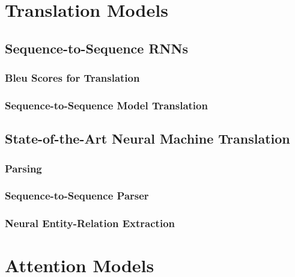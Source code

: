 	\section{Translation Models} %

		\subsection{Sequence-to-Sequence RNNs} %

			\subsubsection{Bleu Scores for Translation} %

			\subsubsection{Sequence-to-Sequence Model Translation} %

		\subsection{State-of-the-Art Neural Machine Translation} %

			\subsubsection{Parsing} %

			\subsubsection{Sequence-to-Sequence Parser} %

			\subsubsection{Neural Entity-Relation Extraction} %

	\section{Attention Models} %


